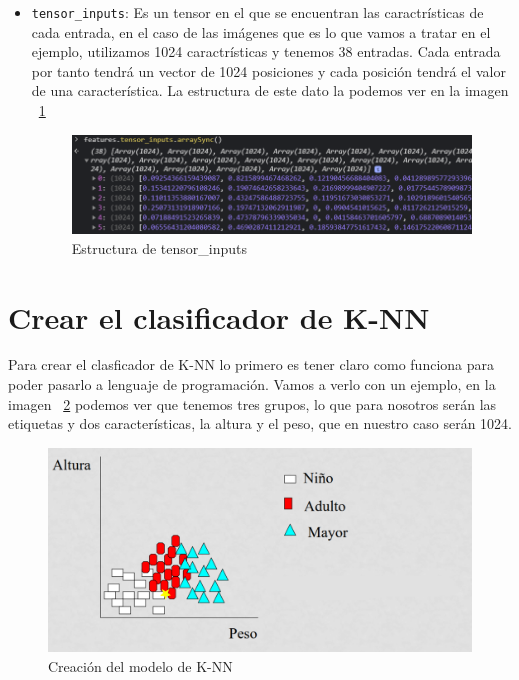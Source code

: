 \documentclass[a4paper, 12pt]{book}
\begin{document}
\begin{itemize}
	\item \texttt{tensor\_inputs}: Es un tensor en el que se encuentran las caractrísticas de cada entrada, en el caso de las imágenes que es lo que vamos a tratar en el ejemplo, utilizamos 1024 caractrísticas y tenemos 38 entradas. Cada entrada por tanto tendrá un vector de 1024 posiciones y cada posición tendrá el valor de una característica. La estructura de este dato la podemos ver en la imagen ~\ref{fig:tensorinputs}

\begin{figure}
	\centering
	\includegraphics[width=12cm, keepaspectratio]{img/tensorinputs}
	\caption{Estructura de tensor\_inputs}				
	\label{fig:tensorinputs}
\end{figure}


\end{itemize}

\section{Crear el clasificador de K-NN} 
\label{sec:knn}

Para crear el clasficador de K-NN lo primero es tener claro como funciona para poder pasarlo a lenguaje de programación. Vamos a verlo con un ejemplo, en  la imagen ~\ref{fig:ejemploknn} podemos ver que tenemos tres grupos, lo que para nosotros serán las etiquetas y dos características, la altura y el peso, que en nuestro caso serán 1024. 

\begin{figure}
	\centering
	\includegraphics[width=12cm, keepaspectratio]{img/ejemploknn}
	\caption{Creación del modelo de K-NN}				
	\label{fig:ejemploknn}
\end{figure}
\end{document}
